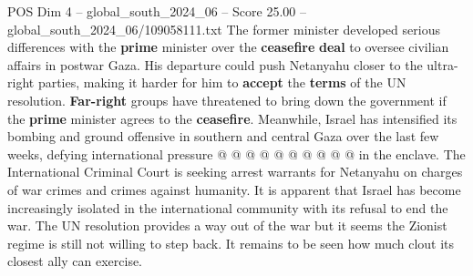 \begin{textsample}{POS Dim 4 – global\_south\_2024\_06 – Score 25.00 – global\_south\_2024\_06/109058111.txt}
The former minister developed serious differences with the \textbf{prime} minister over the \textbf{ceasefire} \textbf{deal} to oversee civilian affairs in postwar Gaza.
His departure could push Netanyahu closer to the ultra-right parties, making it harder for him to \textbf{accept} the \textbf{terms} of the UN resolution. \textbf{Far-right} groups have threatened to bring down the government if the \textbf{prime} minister agrees to the \textbf{ceasefire}.
Meanwhile, Israel has intensified its bombing and ground offensive in southern and central Gaza over the last few weeks, defying international pressure @ @ @ @ @ @ @ @ @ @ in the enclave.
The International Criminal Court is seeking arrest warrants for Netanyahu on charges of war crimes and crimes against humanity.
It is apparent that Israel has become increasingly isolated in the international community with its refusal to end the war.
The UN resolution provides a way out of the war but it seems the Zionist regime is still not willing to step back.
It remains to be seen how much clout its closest ally can exercise.

\end{textsample}
